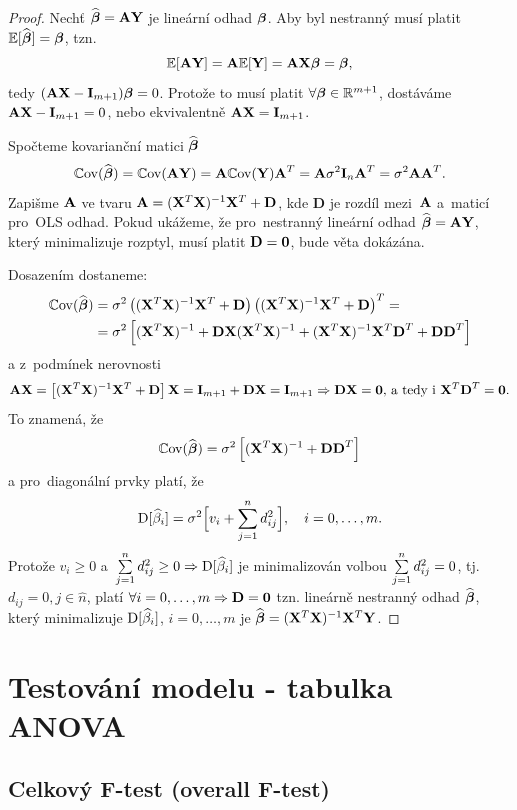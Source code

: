 \begin{proof}
	Nechť $\widehat{\boldsymbol{\beta}} = \textbf{A} \mathbf{Y}$ je lineární odhad $\boldsymbol{\beta}$. Aby byl nestranný musí platit $\mathbb{E} [\widehat{\boldsymbol{\beta}}] = \boldsymbol{\beta}$, tzn. $$ \mathbb{E} [\textbf{A} \mathbf{Y}] = \textbf{A} \mathbb{E} [\mathbf{Y}] = \textbf{A} \mathbf{X} \boldsymbol{\beta} = \boldsymbol{\beta}, $$
	tedy $(\textbf{A} \mathbf{X} - \textbf{I}_{m+1}) \boldsymbol{\beta} = 0$. Protože to musí platit $\forall \boldsymbol{\beta} \in \mathbb{R}^{m+1}$, dostáváme $\textbf{A} \mathbf{X} - \textbf{I}_{m+1} = 0$, nebo ekvivalentně $\textbf{A} \mathbf{X} = \textbf{I}_{m+1}$.
	
	Spočteme kovarianční matici $\widehat{\boldsymbol{\beta}}$
 $$
	\mathbb{C}\mathrm{ov}(\widehat{\boldsymbol{\beta}}) = \mathbb{C}\mathrm{ov}(\textbf{A} \mathbf{Y}) = \textbf{A} \mathbb{C}\mathrm{ov}(\mathbf{Y}) \textbf{A}^T = \textbf{A} \sigma^2 \textbf{I}_{n}  \textbf{A}^T = \sigma^2 \textbf{A} \textbf{A}^T.
 $$
Zapišme $\textbf{A}$ ve tvaru $\textbf{A} = (\mathbf{X}^T \mathbf{X})^{-1} \mathbf{X}^T + \textbf{D}$, kde \textbf{D} je rozdíl mezi~$\textbf{A}$ a~maticí pro~OLS odhad.
Pokud ukážeme, že pro~nestranný lineární odhad $\widehat{\boldsymbol{\beta}} = \textbf{A} \mathbf{Y}$, který minimalizuje rozptyl, musí platit $\textbf{D} = \boldsymbol{0}$, bude věta dokázána.

Dosazením dostaneme:
\begin{align*}
	\mathbb{C}\mathrm{ov}(\widehat{\boldsymbol{\beta}}) & = \sigma^2 \left((\mathbf{X}^T \mathbf{X})^{-1} \mathbf{X}^T + \textbf{D}\right) \left((\mathbf{X}^T \mathbf{X})^{-1} \mathbf{X}^T + \textbf{D}\right)^T = \\
& = \sigma^2 \left[(\mathbf{X}^T \mathbf{X})^{-1} + \textbf{D} \mathbf{X} (\mathbf{X}^T \mathbf{X})^{-1} + (\mathbf{X}^T \mathbf{X})^{-1} \mathbf{X}^T \textbf{D}^T + \textbf{DD}^T \right]
\end{align*}
a z~podmínek nerovnosti
 $$
\textbf{A} \mathbf{X} = \left[(\mathbf{X}^T \mathbf{X})^{-1} \mathbf{X}^T + \textbf{D}\right] \mathbf{X} = \textbf{I}_{m+1} + \textbf{D} \mathbf{X} = \textbf{I}_{m+1}  \Rightarrow  \textbf{D} \mathbf{X} = \boldsymbol{0} \text{, a~tedy i~} \mathbf{X}^T \textbf{D}^T  = \boldsymbol{0}.
 $$
To znamená, že
 $$
\mathbb{C}\mathrm{ov}(\widehat{\boldsymbol{\beta}}) = \sigma^2 \left[(\mathbf{X}^T \mathbf{X})^{-1} + \textbf{DD}^T\right]
 $$
a pro~diagonální prvky platí, že
 $$
\mathrm{D} [\widehat{\beta}_i] = \sigma^2 \Big[v_i + \sum\limits_{j=1}^{n} d_{ij}^2\Big], \quad i = 0,\dots, m.
 $$
Protože $v_i \geq 0$ a~$\sum\limits_{j=1}^{n} d_{ij}^2 \geq 0 \Rightarrow \mathrm{D} [\widehat{\beta}_i]$ je minimalizován volbou $\sum\limits_{j=1}^{n} d_{ij}^2 = 0$, tj. $d_{ij} = 0, j\in\widehat{n}$, platí $\forall i = 0,\dots, m \Rightarrow \textbf{D} = \boldsymbol{0}$ tzn. lineárně nestranný odhad $\widehat{\boldsymbol{\beta}}$, který minimalizuje $\mathrm{D} [\widehat{\beta}_i]$, $i = 0,\dots, m$ je $\widehat{\boldsymbol{\beta}} = (\mathbf{X}^T \mathbf{X})^{-1} \mathbf{X}^T \mathbf{Y}$.
\end{proof}
\section{Testování modelu - tabulka ANOVA}
\subsection{Celkový F-test (overall F-test)}


